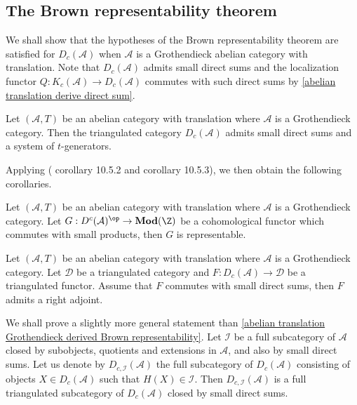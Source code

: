 \subsection{The Brown representability theorem}
We shall show that the hypotheses of the Brown representability theorem are satisfied for $D_c(\mathcal{A})$ when $\mathcal{A}$ is a Grothendieck abelian category with translation. Note that $D_c(\mathcal{A})$ admits small direct sums and the localization functor $Q:K_c(\mathcal{A})\to D_c(\mathcal{A})$ commutes with such direct sums by \cref{abelian translation derive direct sum}.
\begin{theorem}\label{abelian translation Grothendieck derived Brown representability}
Let $(\mathcal{A},T)$ be an abelian category with translation where $\mathcal{A}$ is a Grothendieck category. Then the triangulated category $D_c(\mathcal{A})$ admits small direct sums and a system of $t$-generators.
\end{theorem}
Applying (\cite{kashiwara_SAC} corollary 10.5.2 and corollary 10.5.3), we then obtain the following corollaries.
\begin{corollary}\label{abelian translation Grothendieck derived presheaf representable if}
Let $(\mathcal{A},T)$ be an abelian category with translation where $\mathcal{A}$ is a Grothendieck category. Let $G:D^c(\mathcal{A})^{\op}\to\mathbf{Mod}(\Z)$ be a cohomological functor which commutes with small products, then $G$ is representable.
\end{corollary}
\begin{corollary}\label{abelian translation Grothendieck derived triangulated functor adjoint if}
Let $(\mathcal{A},T)$ be an abelian category with translation where $\mathcal{A}$ is a Grothendieck category. Let $\mathcal{D}$ be a triangulated category and $F:D_c(\mathcal{A})\to\mathcal{D}$ be a triangulated functor. Assume that $F$ commutes with small direct sums, then $F$ admits a right adjoint.
\end{corollary}

We shall prove a slightly more general statement than \cref{abelian translation Grothendieck derived Brown representability}. Let $\mathcal{I}$ be a full subcategory of $\mathcal{A}$ closed by subobjects, quotients and extensions in $\mathcal{A}$, and also by small direct sums. Let us denote by $D_{c,\mathcal{I}}(\mathcal{A})$ the full subcategory of $D_c(\mathcal{A})$ consisting of objects $X\in D_c(\mathcal{A})$ such that $H(X)\in\mathcal{I}$. Then $D_{c,\mathcal{I}}(\mathcal{A})$ is a full triangulated subcategory of $D_c(\mathcal{A})$ closed by small direct sums.

